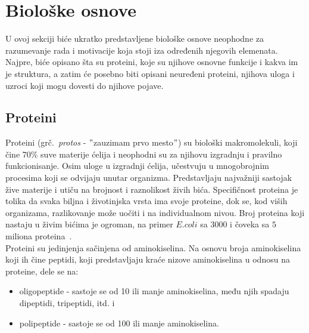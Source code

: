 \chapter{Biološke osnove} %
\label{bioloskeosnove} %

U ovoj sekciji biće ukratko predstavljene biološke osnove neophodne za razumevanje rada i motivacije koja stoji iza određenih njegovih elemenata.
Najpre, biće opisano šta su proteini, koje su njihove osnovne funkcije i kakva im je struktura, a zatim će posebno biti opisani neuređeni proteini, njihova uloga i uzroci koji mogu dovesti do njihove pojave. 

\section{Proteini}
\label{sec:proteini}

Proteini (grč.~{\em protos} - $"$zauzimam prvo mesto$"$) su biološki makromolekuli, koji čine 70\% suve materije ćelija i  neophodni su za njihovu izgradnju i pravilno funkcionisanje. Osim uloge u izgradnji ćelija, učestvuju u mnogobrojnim procesima koji se odvijaju unutar organizma. Predstavljaju najvažniji sastojak žive materije i utiču na brojnost i raznolikost živih bića. Specifičnost proteina je tolika da svaka biljna i životinjska vrsta ima svoje proteine, dok se, kod viših organizama, razlikovanje može uočiti i na individualnom nivou. Broj proteina koji nastaju u živim bićima je ogroman, na primer $E. coli$ sa $3000$ i čoveka sa $5$ miliona proteina~\cite{spasic, Principi}.\\

Proteini su jedinjenja sačinjena od aminokiselina. Na osnovu broja aminokiselina koji ih čine peptidi, koji predstavljaju kraće nizove aminokiselina u odnosu na proteine, dele se na:
\begin{itemize}
\item oligopeptide - sastoje se od 10 ili manje aminokiselina, među njih spadaju dipeptidi, tripeptidi, itd. i 
\item polipeptide - sastoje se od 100 ili manje aminokiselina.
\end{itemize}

